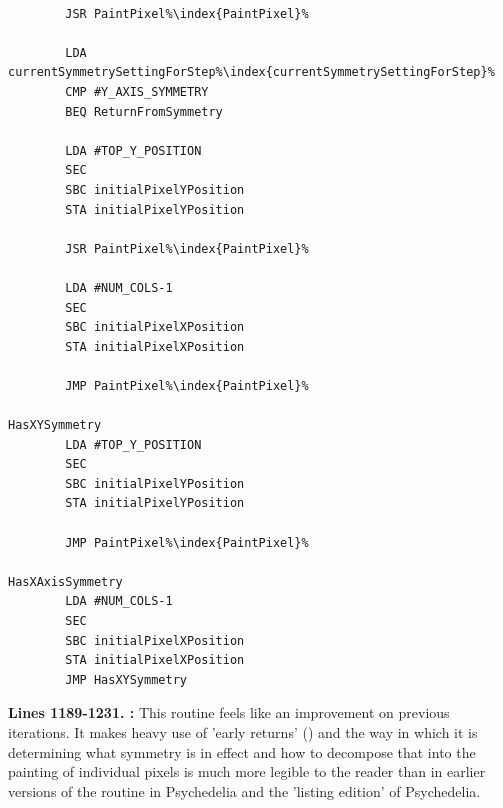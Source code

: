 \begin{lstlisting}[caption = The routine responsible for handling the symmetry in use for painting pixels.,escapechar=\%]

        JSR PaintPixel%\index{PaintPixel}%

        LDA currentSymmetrySettingForStep%\index{currentSymmetrySettingForStep}%
        CMP #Y_AXIS_SYMMETRY
        BEQ ReturnFromSymmetry

        LDA #TOP_Y_POSITION
        SEC 
        SBC initialPixelYPosition
        STA initialPixelYPosition

        JSR PaintPixel%\index{PaintPixel}%

        LDA #NUM_COLS-1
        SEC 
        SBC initialPixelXPosition
        STA initialPixelXPosition

        JMP PaintPixel%\index{PaintPixel}%

HasXYSymmetry   
        LDA #TOP_Y_POSITION
        SEC 
        SBC initialPixelYPosition
        STA initialPixelYPosition

        JMP PaintPixel%\index{PaintPixel}%

HasXAxisSymmetry   
        LDA #NUM_COLS-1
        SEC 
        SBC initialPixelXPosition
        STA initialPixelXPosition
        JMP HasXYSymmetry
\end{lstlisting}

\textbf{Lines 1189-1231. :} This routine feels like an improvement on
previous iterations. It makes heavy use of 'early returns' () and the way in which it is
determining what symmetry is in effect and how to decompose that into the painting of individual pixels is much more
legible to the reader than in earlier versions of the routine in Psychedelia and the 'listing edition' of Psychedelia.

\clearpage

